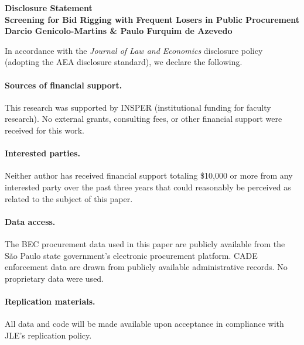 \documentclass[12pt]{article}
\begin{document}
\begin{center}
\large\bfseries Disclosure Statement\\[6pt]
\normalsize
Screening for Bid Rigging with Frequent Losers in Public Procurement\\[4pt]
Darcio Genicolo-Martins \& Paulo Furquim de Azevedo
\end{center}

\bigskip

\noindent In accordance with the \textit{Journal of Law and Economics}
disclosure policy (adopting the AEA disclosure standard), we declare the
following.

\paragraph{Sources of financial support.}
This research was supported by INSPER (institutional funding for faculty
research). No external grants, consulting fees, or other financial
support were received for this work.

\paragraph{Interested parties.}
Neither author has received financial support totaling \$10,000 or more
from any interested party over the past three years that could
reasonably be perceived as related to the subject of this paper.

\paragraph{Data access.}
The BEC procurement data used in this paper are publicly available from
the S\~ao Paulo state government's electronic procurement platform. CADE
enforcement data are drawn from publicly available administrative
records. No proprietary data were used.

\paragraph{Replication materials.}
All data and code will be made available upon acceptance in compliance
with JLE's replication policy.
\end{document}
